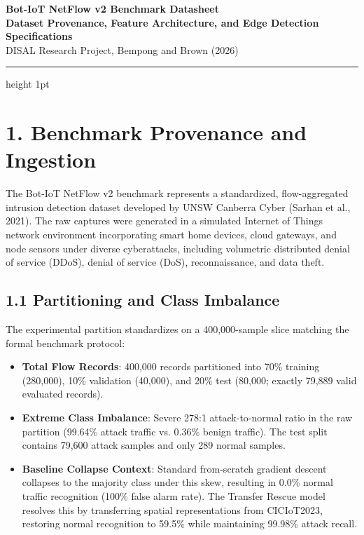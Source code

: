 \documentclass[10pt,a4paper]{article}
\begin{document}
\begin{center}
    {\LARGE \textbf{\textcolor{primary}{Bot-IoT NetFlow v2 Benchmark Datasheet}}}\\[4pt]
    {\large \textbf{Dataset Provenance, Feature Architecture, and Edge Detection Specifications}}\\[3pt]
    {\footnotesize DISAL Research Project, Bempong and Brown (2026)}
\end{center}

\vspace{-4pt}
\hrule height 1pt
\vspace{8pt}

\section*{1. Benchmark Provenance and Ingestion}

The Bot-IoT NetFlow v2 benchmark represents a standardized, flow-aggregated intrusion detection dataset developed by UNSW Canberra Cyber (Sarhan et al., 2021). The raw captures were generated in a simulated Internet of Things network environment incorporating smart home devices, cloud gateways, and node sensors under diverse cyberattacks, including volumetric distributed denial of service (DDoS), denial of service (DoS), reconnaissance, and data theft.

\subsection*{1.1 Partitioning and Class Imbalance}
The experimental partition standardizes on a 400,000-sample slice matching the formal benchmark protocol:
\begin{itemize}
    \setlength\itemsep{0em}
    \item \textbf{Total Flow Records}: 400,000 records partitioned into 70\% training (280,000), 10\% validation (40,000), and 20\% test (80,000; exactly 79,889 valid evaluated records).
    \item \textbf{Extreme Class Imbalance}: Severe 278:1 attack-to-normal ratio in the raw partition (99.64\% attack traffic vs. 0.36\% benign traffic). The test split contains 79,600 attack samples and only 289 normal samples.
    \item \textbf{Baseline Collapse Context}: Standard from-scratch gradient descent collapses to the majority class under this skew, resulting in 0.0\% normal traffic recognition (100\% false alarm rate). The Transfer Rescue model resolves this by transferring spatial representations from CICIoT2023, restoring normal recognition to 59.5\% while maintaining 99.98\% attack recall.
\end{itemize}
\end{document}
